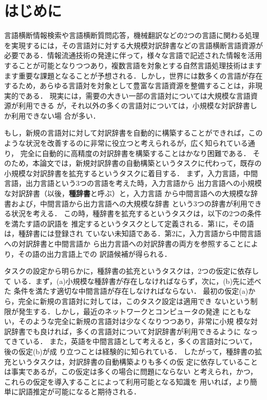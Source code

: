 \documentclass[japanese]{jnlp_1.4}
\begin{document}
\maketitle




\section{はじめに}
\label{sec:intro}

言語横断情報検索や言語横断質問応答，機械翻訳などの2つの言語に関わる処理
を実現するには，その言語対に対する大規模対訳辞書などの言語横断言語資源が
必要である．情報流通技術の発達に伴って，様々な言語で記述された情報を活用
することが可能となりつつあり，複数言語を対象とする自然言語処理技術はます
ます重要な課題となることが予想される．しかし，世界には数多くの言語が存在
するため，あらゆる言語対を対象として豊富な言語資源を整備することは，非現
実的である．
現実には，需要の大きい一部の言語対については大規模な言語資源が利用できる
が，それ以外の多くの言語対については，小規模な対訳辞書しか利用できない場
合が多い．

もし，新規の言語対に対して対訳辞書を自動的に構築することができれば，この
ような状況を改善するのに非常に役立つと考えられるが，広く知られている通り，
完全に自動的に高精度の対訳辞書を構築することはかなり困難である．
そのため，本論文では，新規対訳辞書の自動構築というタスクに代わって，既存の
小規模な対訳辞書を拡充するというタスクに着目する．
まず，入力言語，中間言語，出力言語という3つの言語を考えた時，入力言語から
出力言語への小規模な対訳辞書（以後，{\bfseries 種辞書}と呼ぶ）と，入力言語
から中間言語への大規模な辞書および，中間言語から出力言語への大規模な辞書
という3つの辞書が利用できる状況を考える．
この時，種辞書を拡充するというタスクは，以下の2つの条件を満たす語の訳語を
推定するというタスクとして定義される．第1に，その語は，種辞書には登録され
ていない未知語である．第2に，入力言語から中間言語への対訳辞書と中間言語か
ら出力言語への対訳辞書の両方を参照することにより，その語の出力言語上での
訳語候補が得られる．

タスクの設定から明らかに，種辞書の拡充というタスクは，2つの仮定に依存して
いる．まず，(a)小規模な種辞書が存在しなければならず，次に，(b)先に述べた
条件を満たす適切な中間言語が存在しなければならない．
最初の仮定(a)から，完全に新規の言語対に対しては，このタスク設定は適用でき
ないという制限が発生する．しかし，最近のネットワークとコンピュータの発達
にともない，そのような完全に新規の言語対は少なくなりつつあり，非常に小規
模な対訳辞書でも良ければ，多くの言語対について対訳辞書が利用できるように
なってきている．
また，英語を中間言語として考えると，多くの言語対について，後の仮定(b)が成
り立つことは経験的に知られている．
したがって，種辞書の拡充というタスクは，対訳辞書の自動構築よりも多くの仮
定に依存していることは事実であるが，この仮定は多くの場合に問題にならない
と考えられ，かつ，これらの仮定を導入することによって利用可能となる知識を
用いれば，より簡単に訳語推定が可能になると期待される．
\end{document}
